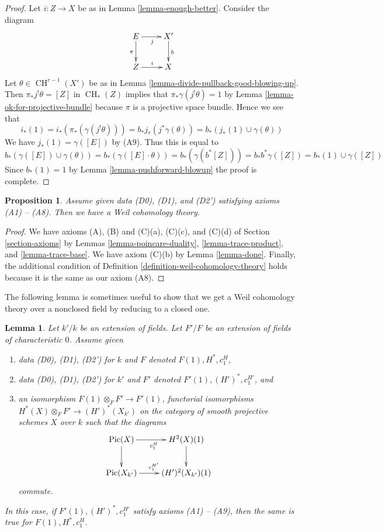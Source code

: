 \documentclass{stacks-project}
\theoremstyle{plain}
\newtheorem{proposition}[subsection]{Proposition}
\newtheorem{lemma}[subsection]{Lemma}
\theoremstyle{definition}
\theoremstyle{remark}
\numberwithin{equation}{subsection}
\def\CH{\mathop{\mathrm{CH}}\nolimits}
\def\Pic{\mathop{\mathrm{Pic}}\nolimits}
\begin{document}
\begin{proof}
Let $i : Z \to X$ be as in Lemma \ref{lemma-enough-better}. Consider
the diagram
$$
\xymatrix{
E \ar[r]_j \ar[d]_\pi & X' \ar[d]^b \\
Z \ar[r]^i & X
}
$$
Let $\theta \in \CH^{r - 1}(X')$ be as in
Lemma \ref{lemma-divide-pullback-good-blowing-up}.
Then $\pi_*j^!\theta = [Z]$ in $\CH_*(Z)$ implies that
$\pi_*\gamma(j^!\theta) = 1$ by Lemma \ref{lemma-ok-for-projective-bundle}
because $\pi$ is a projective space bundle.
Hence we see that
$$
i_*(1) = i_*(\pi_*(\gamma(j^!\theta))) =
b_*j_*(j^*\gamma(\theta)) =
b_*(j_*(1) \cup \gamma(\theta))
$$
We have $j_*(1) = \gamma([E])$ by (A9). Thus this is equal to
$$
b_*(\gamma([E]) \cup \gamma(\theta)) =
b_*(\gamma([E] \cdot \theta)) =
b_*(\gamma(b^*[Z])) =
b_*b^*\gamma([Z]) = b_*(1) \cup \gamma([Z])
$$
Since $b_*(1) = 1$ by Lemma \ref{lemma-pushforward-blowup} the
proof is complete.
\end{proof}

\begin{proposition}
\label{proposition-get-weil}
Assume given data (D0), (D1), and (D2') satisfying axioms (A1) -- (A8).
Then we have a Weil cohomology theory.
\end{proposition}

\begin{proof}
We have axioms (A), (B) and (C)(a), (C)(c), and (C)(d) of
Section \ref{section-axioms} by
Lemmas \ref{lemma-poincare-duality}, \ref{lemma-trace-product}, and
\ref{lemma-trace-base}.
We have axiom (C)(b) by
Lemma \ref{lemma-done}.
Finally, the additional condition of
Definition \ref{definition-weil-cohomology-theory}
holds because it is the same as our axiom (A8).
\end{proof}

\noindent
The following lemma is sometimes useful to show that we get a
Weil cohomology theory over a nonclosed field by reducing to a
closed one.

\begin{lemma}
\label{lemma-check-over-extension}
Let $k'/k$ be an extension of fields. Let $F'/F$ be an extension
of fields of characteristic $0$. Assume given
\begin{enumerate}
\item data (D0), (D1), (D2') for $k$ and $F$ denoted
$F(1), H^*, c_1^H$,
\item data (D0), (D1), (D2') for $k'$ and $F'$ denoted
$F'(1), (H')^*, c_1^{H'}$, and
\item an isomorphism $F(1) \otimes_F F' \to F'(1)$, functorial isomorphisms
$H^*(X) \otimes_F F' \to (H')^*(X_{k'})$ on the category of smooth projective
schemes $X$ over $k$ such that the diagrams
$$
\xymatrix{
\Pic(X) \ar[r]_{c_1^H} \ar[d] & H^2(X)(1) \ar[d] \\
\Pic(X_{k'}) \ar[r]^{c_1^{H'}} & (H')^2(X_{k'})(1)
}
$$
commute.
\end{enumerate}
In this case, if $F'(1), (H')^*, c_1^{H'}$ satisfy axioms (A1) -- (A9),
then the same is true for $F(1), H^*, c_1^H$.
\end{lemma}
\end{document}
